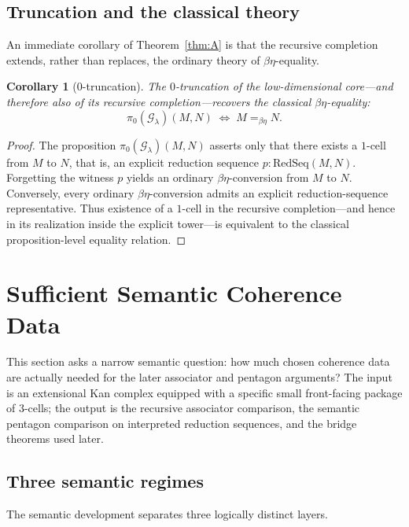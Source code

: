 \documentclass[webpdf,traditional,large,numbered]{oup-authoring-template}
\theoremstyle{thmstyleone}%
\newtheorem{corollary}[theorem]{Corollary}
\theoremstyle{thmstyletwo}%
\theoremstyle{thmstylethree}%
\newcommand{\ReductionSeq}{\mathrm{RedSeq}}
\begin{document}
\subsection{Truncation and the classical theory}

An immediate corollary of Theorem~\ref{thm:A} is that the recursive completion
extends, rather than replaces, the ordinary theory of $\beta\eta$-equality.

\begin{corollary}[0-truncation]
The $0$-truncation of the low-dimensional core---and therefore also of its
recursive completion---recovers the classical $\beta\eta$-equality:
\[
\pi_0(\mathscr{G}_\lambda)(M,N)
\;\Longleftrightarrow\;
M =_{\beta\eta} N.
\]
\end{corollary}

\begin{proof}
The proposition $\pi_0(\mathscr{G}_\lambda)(M,N)$ asserts only that there exists
a $1$-cell from $M$ to $N$, that is, an explicit reduction sequence
$p:\ReductionSeq(M,N)$.  Forgetting the witness $p$ yields an ordinary
$\beta\eta$-conversion from $M$ to $N$.  Conversely, every ordinary
$\beta\eta$-conversion admits an explicit reduction-sequence representative.
Thus existence of a $1$-cell in the recursive completion---and hence in its
realization inside the explicit tower---is equivalent to the classical
proposition-level equality relation.
\end{proof}

\section{Sufficient Semantic Coherence Data}\label{sec:front-seed}

This section asks a narrow semantic question: how much chosen coherence data
are actually needed for the later associator and pentagon arguments?  The input
is an extensional Kan complex equipped with a specific small front-facing
package of $3$-cells; the output is the recursive associator comparison, the
semantic pentagon comparison on interpreted reduction sequences, and the bridge
theorems used later.

\subsection{Three semantic regimes}

The semantic development separates three logically distinct layers.
\end{document}
